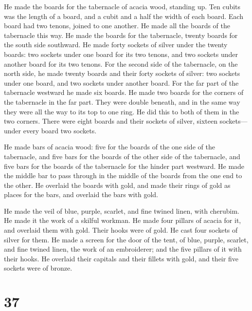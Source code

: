  He made the boards for the tabernacle of acacia wood,
standing up.  Ten cubits was the length of a board, and a
cubit and a half the width of each board.  Each board had
two tenons, joined to one another. He made all the boards of the
tabernacle this way.  He made the boards for the
tabernacle, twenty boards for the south side southward. 
He made forty sockets of silver under the twenty boards: two sockets
under one board for its two tenons, and two sockets under another board
for its two tenons.  For the second side of the
tabernacle, on the north side, he made twenty boards  and
their forty sockets of silver: two sockets under one board, and two
sockets under another board.  For the far part of the
tabernacle westward he made six boards.  He made two
boards for the corners of the tabernacle in the far part.
 They were double beneath, and in the same way they were
all the way to its top to one ring. He did this to both of them in the
two corners.  There were eight boards and their sockets
of silver, sixteen sockets---under every board two sockets.

 He made bars of acacia wood: five for the boards of the
one side of the tabernacle,  and five bars for the boards
of the other side of the tabernacle, and five bars for the boards of the
tabernacle for the hinder part westward.  He made the
middle bar to pass through in the middle of the boards from the one end
to the other.  He overlaid the boards with gold, and made
their rings of gold as places for the bars, and overlaid the bars with
gold.

 He made the veil of blue, purple, scarlet, and fine
twined linen, with cherubim. He made it the work of a skilful workman.
 He made four pillars of acacia for it, and overlaid them
with gold. Their hooks were of gold. He cast four sockets of silver for
them.  He made a screen for the door of the tent, of
blue, purple, scarlet, and fine twined linen, the work of an
embroiderer;  and the five pillars of it with their
hooks. He overlaid their capitals and their fillets with gold, and their
five sockets were of bronze.

\hypertarget{section-36}{%
\section{37}\label{section-36}}

